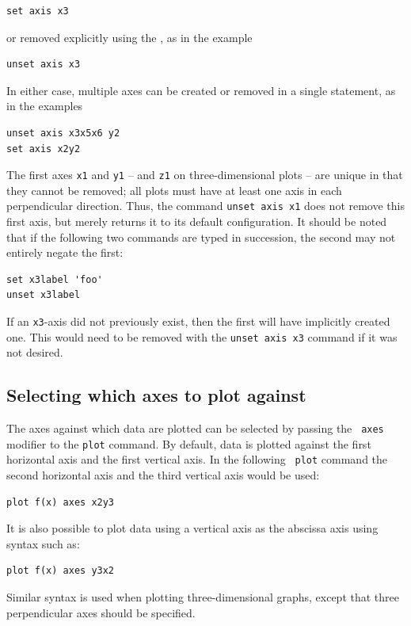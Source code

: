 \begin{verbatim}
set axis x3
\end{verbatim}

\noindent or removed explicitly using the , as in the
example

\begin{verbatim}
unset axis x3
\end{verbatim}

\noindent In either case, multiple axes can be created or removed in a single
statement, as in the examples

\begin{verbatim}
unset axis x3x5x6 y2
set axis x2y2
\end{verbatim}

\noindent The first axes {\tt x1} and {\tt y1} -- and {\tt z1} on
three-dimensional plots -- are unique in that they cannot be removed; all plots
must have at least one axis in each perpendicular direction.  Thus, the command
{\tt unset axis x1} does not remove this first axis, but merely returns it to
its default configuration.  It should be noted that if the following two
commands are typed in succession, the second may not entirely negate the first:

\begin{verbatim}
set x3label 'foo'
unset x3label
\end{verbatim}

\noindent If an {\tt x3}-axis did not previously exist, then the first will
have implicitly created one. This would need to be removed with the {\tt unset
axis x3} command if it was not desired.

\subsection{Selecting which axes to plot against}

The axes against which data are plotted can be selected by passing the {\tt
axes} modifier to the {\tt plot} command. By default, data is plotted against
the first horizontal axis and the first vertical axis. In the following {\tt
plot} command the second horizontal axis and the third vertical axis would be
used:
\begin{verbatim}
plot f(x) axes x2y3
\end{verbatim}
It is also possible to plot data using a vertical axis as the abscissa axis
using syntax such as:
\begin{verbatim}
plot f(x) axes y3x2
\end{verbatim}
Similar syntax is used when plotting three-dimensional graphs, except that
three perpendicular axes should be specified.

